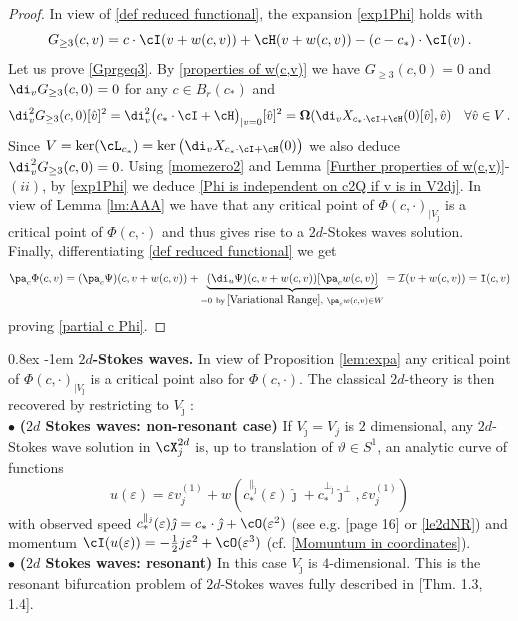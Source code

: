 \documentclass[11pt,a4paper,reqno]{article}
\makeatletter
\renewcommand{\paragraph}{%
  \@startsection{paragraph}{4}{\z@}%
  {0.8ex}  %
  {-1em}   %
  {\normalfont\bfseries}%
}
\numberwithin{equation}{section}
\theoremstyle{definition}
\makeatother
\begin{document}
    \begin{proof}
    In view of 
    \eqref{def reduced functional},  
   the expansion  \eqref{exp1Phi} holds with 
        $$
            G_{\geq 3}(c,v) =c\cdot \cI(v+w(c,v))+\cH(v+w(c,v))-(c-c_*)\cdot \cI(v)\, .
        $$
Let us prove  \eqref{Gprgeq3}. By 
\eqref{properties of w(c,v)} 
we have  $G_{\geq 3}(c,0)=0$ and $\di_v G_{\geq 3}(c,0)=0$ for any $ c \in B_r(c_*)$ and 
    \begin{equation*}
        \di_v^2 G_{\geq 3}(c,0)[\hat v]^2 =\di_v^2\big(c_*\cdot \cI + \cH \big)_{|v=0} [\hat v]^2=\boldsymbol{\Omega}(\di_v X_{c_*\cdot \cI+\cH}(0)[\hat v],\hat v)\quad \forall \hat v\in V\, .
    \end{equation*}
        Since $V =\ker (\cL_{c_*})=\ker \big(\di_v X_{c_*\cdot \cI+\cH}(0)\big)$ we also deduce $\di_v^2G_{\geq 3}(c,0)=0$.
        Using \eqref{momezero2} and Lemma \ref{Further properties of w(c,v)}-$(ii)$, by \eqref{exp1Phi} we deduce  \eqref{Phi is independent on c2Q if v is in V2dj}.
        In view of Lemma \ref{lm:AAA} we have that any critical point of $\Phi(c,\cdot)_{|V_{\hat \jmath}}$ is a critical point of $\Phi(c,\cdot)$ and thus gives rise to a $2d$-Stokes waves solution.
        Finally, differentiating  \eqref{def reduced functional}
we get 
$$
\pa_c \Phi (c, v) =   
(\pa_c \Psi) (c, v+ w(c,v)) + 
\underbrace{(\di_u \Psi) (c, v+ w(c,v))[ \pa_c w(c,v) ]}_{=0 \ \text{by}\, \eqref{Variational Range},
\ \pa_c w(c,v)  \in W}= {\mathcal I}(v+ w(c,v)) = {\mathtt I}(c,v)
$$
proving \eqref{partial c Phi}. 
    \end{proof}


\paragraph{\bf $2d$-Stokes waves.} In view of Proposition \ref{lem:expa} any critical point of $\Phi(c,\cdot)_{|V_{\hat \jmath}}$ is a critical point also for $\Phi(c,\cdot )$. 
 The 
 classical  $2d$-theory is then recovered by restricting to $V_{\hat \jmath}$ :
\\[1.5mm]
{$\bullet$ \bf ($2d$ Stokes waves: non-resonant case)}
If $V_{\hat \jmath}=V_j$ is $2$ dimensional, any $2d$-Stokes wave solution in $\cX_{j}^{2d}$ is, up to translation of $\vartheta \in S^1 $,  an analytic curve of functions
\begin{equation}\label{2dstokesNR} u(\varepsilon)=\varepsilon v_j^{(1)}+w(c^{\parallel_{\hat\jmath}}_*(\varepsilon)\hat \jmath+c_*^{\bot_{\hat \jmath}}\hat \jmath^\bot,\varepsilon v_j^{(1)})
\end{equation}
with observed speed
$ c_*^{\parallel_{\hat \jmath} }(\varepsilon ) \hat \jmath = 
c_* \cdot {\hat \jmath} + \cO(\varepsilon^2)$
(see e.g. \cite{BBMM}[page 16] or \eqref{le2dNR})   
and momentum 
$ \cI(u(\varepsilon))=-\tfrac12 j \varepsilon^2+\cO(\varepsilon^3) $ (cf. \eqref{Momuntum in coordinates}). 
\\[1.5mm]
$ \bullet $ {\bf ($2d$ Stokes waves: resonant)} 
In this case 
$  V_{\hat \jmath} $ is $ 4 $-dimensional. 
This is the resonant bifurcation 
problem of  $2d$-Stokes waves fully described   
in \cite{BBMM}[Thm. 1.3, 1.4].
\end{document}
